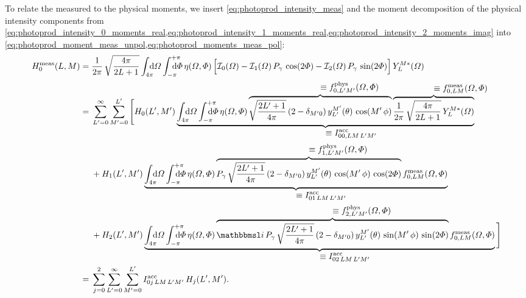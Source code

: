 To relate the measured to the physical moments, we insert
\cref{eq:photoprod_intensity_meas} and the moment decomposition of the
physical intensity components from
\cref{eq:photoprod_intensity_0_moments_real,eq:photoprod_intensity_1_moments_real,eq:photoprod_intensity_2_moments_imag}
into
\cref{eq:photoprod_moment_meas_unpol,eq:photoprod_moments_meas_pol}:
\begin{align}
  H_0^\text{meas}(L, M)
  ={}& \frac{1}{2 \pi}\, \sqrt{\frac{4 \pi}{2 L + 1}} \int_{4 \pi}\!\!\!\! \dif{\Omega} \int_{-\pi}^{+\pi}\hspace{-1.2em} \dif{\Phi}\,
  \eta(\Omega, \Phi) \sBrk[2]{\mathcal{I}_0(\Omega)
  - \mathcal{I}_1(\Omega)\, P_\gamma\, \cos(2 \Phi)
  - \mathcal{I}_2(\Omega)\, P_\gamma\, \sin(2 \Phi)}
  Y_L^{M *}(\Omega) \notag
  \\
  ={}& \sum_{L' = 0}^\infty \sum_{M' = 0}^{L'} \Bigg[
  H_0(L', M')\,
  \rdUnderbrace{\int_{4 \pi}\!\!\!\! \dif{\Omega} \int_{-\pi}^{+\pi}\hspace{-1.2em} \dif{\Phi}\,
  \eta(\Omega, \Phi)\,
  \rdOverbrace{\sqrt{\frac{2 L' + 1}{4 \pi}}\, (2 - \delta_{M' 0})\, y_{L'}^{M'}(\theta)\, \cos(M'\, \phi)\vphantom{\frac{Y_L^M}{\sqrt{L}}}}{\equiv f_{0, L' M'}^\text{phys}(\Omega, \Phi)}\,
  \rdOverbrace{\frac{1}{2 \pi}\, \sqrt{\frac{4 \pi}{2 L + 1}}\, Y_L^{M *}(\Omega)}{\equiv f_{0, L M}^\text{meas}(\Omega, \Phi)}}%
  {\equiv I^\text{acc}_{0 0, L M\, L' M'}} \notag
  \\
  & + H_1(L', M')\,
  \rdUnderbrace{\int_{4 \pi}\!\!\!\! \dif{\Omega} \int_{-\pi}^{+\pi}\hspace{-1.2em} \dif{\Phi}\,
  \eta(\Omega, \Phi)\,
  \rdOverbrace{P_\gamma\, \sqrt{\frac{2 L' + 1}{4 \pi}}\, (2 - \delta_{M' 0})\, y_{L'}^{M'}(\theta)\, \cos(M'\, \phi)\, \cos(2 \Phi)}{\equiv f_{1, L' M'}^\text{phys}(\Omega, \Phi)}\,
  f_{0, L M}^\text{meas}(\Omega, \Phi)}%
  {\equiv I^\text{acc}_{0 1\, L M\, L' M'}} \notag
  \\
  & + H_2(L', M')\,
  \rdUnderbrace{\int_{4 \pi}\!\!\!\! \dif{\Omega} \int_{-\pi}^{+\pi}\hspace{-1.2em} \dif{\Phi}\,
  \eta(\Omega, \Phi)\,
  \rdOverbrace{\imag\, P_\gamma\, \sqrt{\frac{2 L' + 1}{4 \pi}}\, (2 - \delta_{M' 0})\, y_{L'}^{M'}(\theta)\, \sin(M'\, \phi)\, \sin(2 \Phi)}{\equiv f_{2, L' M'}^\text{phys}(\Omega, \Phi)}\,
  f_{0, L M}^\text{meas}(\Omega, \Phi)}%
  {\equiv I^\text{acc}_{0 2\, L M\, L' M'}}\, \Bigg] \notag
  \\
  \label{eq:photoprod_moment_0_meas2}
  ={}& \sum_{j = 0}^2 \sum_{L' = 0}^\infty \sum_{M' = 0}^{L'}
  I^\text{acc}_{0 j\, L M\, L' M'}\, H_j(L', M').
\end{align}

